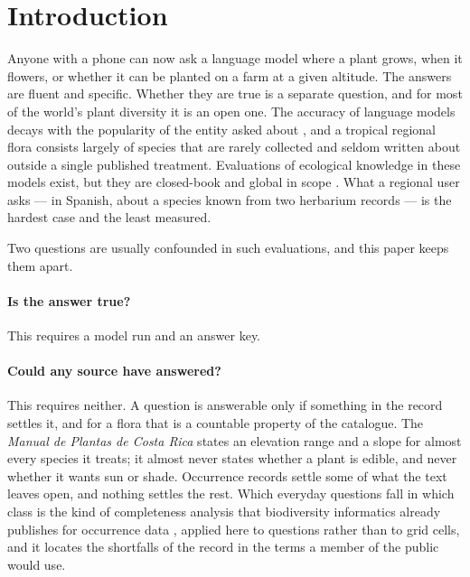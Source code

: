 \documentclass[11pt,a4paper]{article}
\begin{document}
\section{Introduction}

Anyone with a phone can now ask a language model where a plant grows, when it
flowers, or whether it can be planted on a farm at a given altitude. The answers are
fluent and specific. Whether they are true is a separate question, and for most of
the world's plant diversity it is an open one. The accuracy of language models decays
with the popularity of the entity asked about \citep{kandpal2023longtail,
mallen2023popqa}, and a tropical regional flora consists largely of species that are
rarely collected and seldom written about outside a single published treatment.
Evaluations of ecological knowledge in these models exist, but they are closed-book
and global in scope \citep{dorm2025ecological,uryu2025iucn}. What a regional user
asks --- in Spanish, about a species known from two herbarium records --- is the
hardest case and the least measured.

Two questions are usually confounded in such evaluations, and this paper keeps them
apart.

\paragraph{Is the answer true?} This requires a model run and an answer key.

\paragraph{Could any source have answered?} This requires neither. A question is
answerable only if something in the record settles it, and for a flora that is a
countable property of the catalogue. The \emph{Manual de Plantas de Costa Rica}
\citep{hammel_manual} states an elevation range and a slope for almost every species
it treats; it almost never states whether a plant is edible, and never whether it
wants sun or shade. Occurrence records settle some of what the text leaves open, and
nothing settles the rest. Which everyday questions fall in which class is the kind of
completeness analysis that biodiversity informatics already publishes for occurrence
data \citep{arvizu2025reptiles}, applied here to questions rather than to grid cells,
and it locates the shortfalls of the record \citep{hortal2015shortfalls} in the terms
a member of the public would use.
\end{document}
